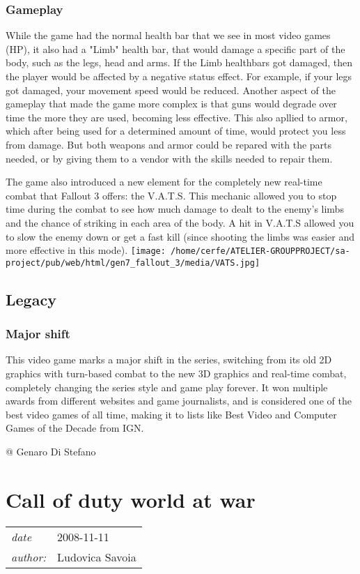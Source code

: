 \documentclass[a4paper,10pt]{book}
\newcommand{\pageHeader}[4]{
    \section{#1}
    \vspace{-0.3cm}
    \begin{table}[h!]
     \begin{tabular}{ll}
        \hline
        \textit{date} & #2 \\
        \textit{author: } & #3\\
        \hline
     \end{tabular}
    \end{table}
    \vspace{-0.3cm}
}
\begin{document}
 \subsubsection{Gameplay }
 
          While the game had the normal health bar that we see in most video games (HP), it also had a "Limb" health bar, that would damage a specific part of the body, such as the legs, head and arms. If the Limb healthbars got damaged, then the player would be affected by a negative status effect. For example, if your legs got damaged, your movement speed would be reduced. Another aspect of the gameplay that made the game more complex is that guns would degrade over time the more they are used, becoming less effective. This also apllied to armor, which after being used for a determined amount of time, would protect you less from damage. But both weapons and armor could be repared with the parts needed, or by giving them to a vendor with the skills needed to repair them.
         
 The game also introduced a new element for the completely new real-time combat that Fallout 3 offers: the V.A.T.S. This mechanic allowed you to stop time during the combat to see how much damage to dealt to the enemy's limbs and the chance of striking in each area of the body. A hit in V.A.T.S allowed you to slow the enemy down or get a fast kill (since shooting the limbs was easier and more effective in this mode). 
 \texttt{[image: /home/cerfe/ATELIER-GROUPPROJECT/sa-project/pub/web/html/gen7\_fallout\_3/media/VATS.jpg]}  
 \subsection{Legacy }
 \subsubsection{Major shift }
 
        This video game marks a major shift in the series, switching from its old 2D graphics with turn-based combat to the new 3D graphics and real-time combat, completely changing the series style and game play forever. It won multiple awards from different websites and game journalists, and is considered one of the best video games of all time, making it to lists like Best Video and Computer Games of the Decade from IGN.
         
 
 @ Genaro Di Stefano 
 
 \newpage\pageHeader{Call of duty world at war}{2008-11-11}{Ludovica Savoia}{It immerses players into the most gritty and chaotic WWII combat ever experienced}
\end{document}
